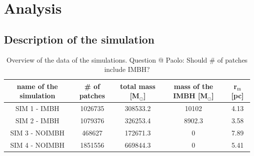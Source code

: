 \section{Analysis}

\subsection{Description of the simulation}
\begin{table}[htbp]
\centering
\begin{tabular}{ c | c | c | c | c }
name of the simulation & \# of patches & total mass [M\(_\odot\)]& \makecell{mass of the \\ \ac{IMBH} [M\(_\odot\)]}& r\(_\mathrm{m}\) [pc]\\
\hline			
  SIM 1 - IMBH & 1026735 & 308533.2 & 10102 & 4.13 \\
  SIM 2 - IMBH & 1079376& 326253.4 & 8902.3 & 3.58\\
  SIM 3 - NOIMBH & 468627& 172671.3& 0 & 7.89\\
  SIM 4 - NOIMBH & 1851556& 669844.3& 0 & 5.41\\

\end{tabular}
\caption{Overview of the data of the simulations.\color{red} Question @ Paolo: Should \# of patches include IMBH? \color{black}}
\end{table}

